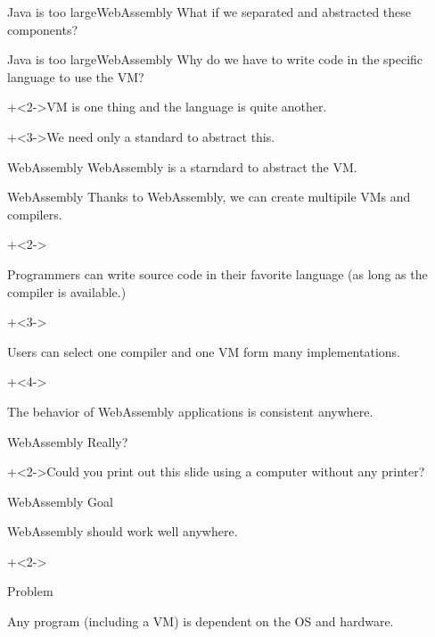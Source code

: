 \begin{frame}{Java is too large}{WebAssembly}
    What if we separated and abstracted these components?
\end{frame}


\begin{frame}{Java is too large}{WebAssembly}
    Why do we have to write code in the specific language to use the VM?
    \vspace{4ex}

    \onslide+<2->{VM is one thing and the language is quite another.}
    \vspace{4ex}

    \onslide+<3->{We need only a standard to abstract this.}
\end{frame}


\begin{frame}{WebAssembly}{}
    {\Large WebAssembly is a starndard to abstract the VM.}
\end{frame}


\begin{frame}{WebAssembly}{}
    Thanks to WebAssembly, we can create multipile VMs and compilers.
    \vspace{4ex}

    \begin{itemize}
        \onslide+<2->{\item Programmers can write source code in their favorite language (as long as the compiler is available.)}
        \onslide+<3->{\item Users can select one compiler and one VM form many implementations.}
        \onslide+<4->{\item The behavior of WebAssembly applications is consistent anywhere.}
    \end{itemize}
\end{frame}


\begin{frame}{WebAssembly}{}
    {\Huge Really?}
    \vspace{4ex}

    \onslide+<2->{Could you print out this slide using a computer without any printer?}
\end{frame}


\begin{frame}{WebAssembly}{}
    Goal
    \vspace{2ex}

    WebAssembly should work well anywhere.
    \vspace{4ex}

    \onslide+<2->{
        Problem
        \vspace{2ex}

        Any program (including a VM) is dependent on the OS and hardware.
    }
\end{frame}


